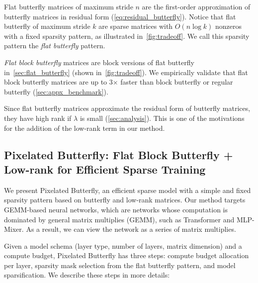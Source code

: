 Flat butterfly matrices of maximum stride $n$ are the first-order approximation of butterfly matrices in residual form (\ref{eq:residual_butterfly}).
Notice that flat butterfly of maximum stride $k$ are sparse matrices with $O(n \log k)$ nonzeros with a fixed sparsity pattern, as illustrated in~\ref{fig:tradeoff}.
We call this sparsity pattern the \emph{flat butterfly} pattern.

\emph{Flat block butterfly} matrices are block versions of flat butterfly in~\ref{sec:flat_butterfly} (shown in~\ref{fig:tradeoff}).
We empirically validate that flat block butterfly matrices are up to 3$\times$
faster than block butterfly or regular butterfly (\ref{sec:appx_benchmark}).

Since flat butterfly matrices approximate the residual form of butterfly matrices, they have high rank if $\lambda$ is small (\ref{sec:analysis}).
This is one of the motivations for the addition of the low-rank term in our method.

\subsection{Pixelated Butterfly: Flat Block Butterfly + Low-rank for Efficient Sparse Training}
\label{sec:method}

We present Pixelated Butterfly, an efficient sparse model with a simple and fixed sparsity pattern based on butterfly and low-rank matrices. Our method targets GEMM-based neural networks, which are networks whose computation is dominated by general matrix multiplies (GEMM), such as Transformer and MLP-Mixer. As a result, we can view the network as a series of matrix multiplies.

Given a model schema (layer type, number of layers, matrix dimension) and a compute budget, Pixelated Butterfly has three steps: compute budget allocation per layer, sparsity mask selection from the flat butterfly pattern, and model sparsification. We describe these steps in more details:

